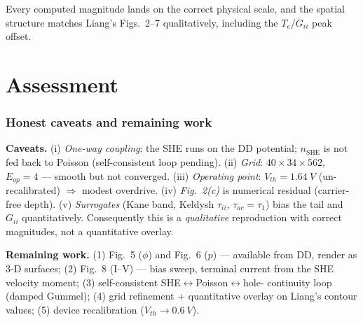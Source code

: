\documentclass[11pt]{article}
\begin{document}
Every computed magnitude lands on the correct physical scale, and the spatial structure
matches Liang's Figs.~2--7 qualitatively, including the $T_e$/$G_{ii}$ peak offset.

\part{Assessment}
\section{Honest caveats and remaining work}\label{sec:caveats}
\textbf{Caveats.} (i) \emph{One-way coupling}: the SHE runs on the DD potential; $n_{\text{SHE}}$
is not fed back to Poisson (self-consistent loop pending). (ii) \emph{Grid}:
$40\times34\times562$, $E_{op}=4$ --- smooth but not converged. (iii) \emph{Operating point}:
$V_{th}=\SI{1.64}{V}$ (un-recalibrated) $\Rightarrow$ modest overdrive. (iv) \emph{Fig.~2(c)}
is numerical residual (carrier-free depth). (v) \emph{Surrogates} (Kane band, Keldysh
$\tau_{ii}$, $\tau_{ac}=\tau_1$) bias the tail and $G_{ii}$ quantitatively. Consequently this
is a \emph{qualitative} reproduction with correct magnitudes, not a quantitative overlay.

\smallskip\noindent\textbf{Remaining work.} (1) Fig.~5 ($\phi$) and Fig.~6 ($p$) --- available
from DD, render as 3-D surfaces; (2) Fig.~8 (I--V) --- bias sweep, terminal current from the
SHE velocity moment; (3) self-consistent SHE$\leftrightarrow$Poisson$\leftrightarrow$hole-
continuity loop (damped Gummel); (4) grid refinement + quantitative overlay on Liang's contour
values; (5) device recalibration ($V_{th}\to\SI{0.6}{V}$).

\appendix
\end{document}
